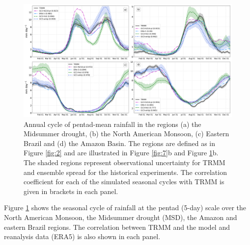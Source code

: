 \begin{figure}[b!]
\centering
 \includegraphics[width=1.0\linewidth]{figures/amipseasonalcycle.png}
\caption[Annual cycle of precipitation in different regions of the AMS]{Annual cycle of pentad-mean rainfall in the regions (a) the Midsummer drought, (b) the North American Monsoon, (c) Eastern Brazil and (d) the Amazon Basin. The regions are defined as in Figure \ref{fig:2} and are illustrated in Figure \ref{fig:7}b and Figure \ref{fig:8}b. The shaded regions represent observational uncertainty for TRMM and ensemble spread for the historical experiments. The correlation coefficient for each of the simulated seasonal cycles with TRMM is given in brackets in each panel.  }
\label{fig:8}
\end{figure}


Figure \ref{fig:8} shows the seasonal cycle of rainfall at the pentad (5-day) scale over the North American Monsoon, the  Midsummer drought (MSD), the Amazon and eastern Brazil regions. The correlation between TRMM and the model and reanalysis data (ERA5) is also shown in each panel. 

